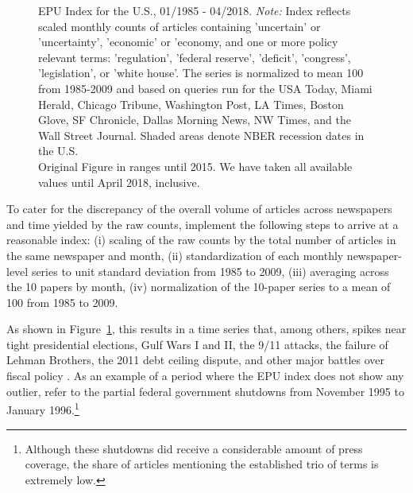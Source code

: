 \documentclass[a4paper,11pt,listof=nochaptergap,oneside,pointednumbers,bibtotoc,bigheadings,liststotoc]{scrbook}
\begin{document}
\begin{figure}[!h]
   \centering
   \setlength\fboxsep{0pt}
   \setlength\fboxrule{0pt}
      \caption[EPU Index for the U.S., 01/1985 - 04/2018.]{EPU Index for the U.S., 01/1985 - 04/2018.
      \textit{Note:} Index reflects scaled monthly counts of articles containing 'uncertain' or 'uncertainty', 'economic' or 'economy, and one or more policy relevant terms: 'regulation', 'federal reserve', 'deficit', 'congress', 'legislation', or 'white house'. The series is normalized to mean 100 from 1985-2009 and based on queries run for the USA Today, Miami Herald, Chicago Tribune, Washington Post, LA Times, Boston Glove, SF Chronicle, Dallas Morning News, NW Times, and the Wall Street Journal. Shaded areas denote NBER recession dates in the U.S.\\
      Original Figure in \citet{bakeretal:15} ranges until 2015. We have taken all available values until April 2018, inclusive.}   \label{fig:epuindex}
\end{figure}

To cater for the discrepancy of the overall volume of articles across newspapers and time yielded by the raw counts, \citet{bakeretal:15} implement the following steps to arrive at a reasonable index: (i) scaling of the raw counts by the total number of articles in the same newspaper and month, (ii) standardization of each monthly newspaper-level series to unit standard deviation from 1985 to 2009, (iii) averaging across the 10 papers by month, (iv) normalization of the 10-paper series to a mean of 100 from 1985 to 2009.

As shown in Figure~\ref{fig:epuindex}, this results in a time series that, among others, spikes near tight presidential elections, Gulf Wars I and II, the 9/11 attacks, the failure of Lehman Brothers, the 2011 debt ceiling dispute, and other major battles over fiscal policy \citep{bakeretal:15}. As an example of a period where the EPU index does not show any outlier, \citet{bakeretal:15} refer to the partial federal government shutdowns from November 1995 to January 1996.\footnote{Although these shutdowns did receive a considerable amount of press coverage, the share of articles mentioning the established trio of terms is extremely low.} 
\end{document}
